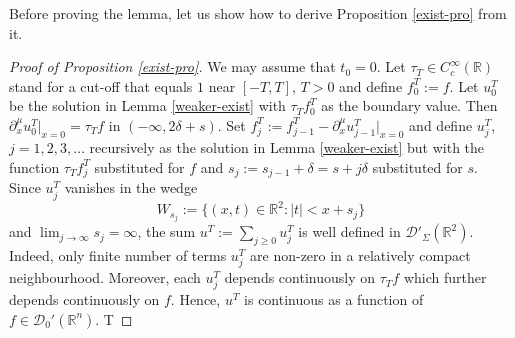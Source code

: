 \documentclass[10pt,a4paper]{article}
\theoremstyle{plain}
\theoremstyle{definition}
\theoremstyle{remark}
\numberwithin{equation}{section}
\newcommand{\R}{\mathbb{R}}
\begin{document}
Before proving the lemma, let us show how to derive Proposition \ref{exist-pro} from it. 

\begin{proof}[Proof of Proposition \ref{exist-pro}]
We may assume that $t_0 = 0$. 
Let { $\tau_T \in C_c^\infty(\R)$ stand for a cut-off that equals $1$ near $[-T, T]$, $T>0$ and define $f_0^T := f$. Let $ u_{0}^T$ be the solution in Lemma \ref{weaker-exist} with $\tau_T f_0^T$ as  the boundary value. }
Then $\partial_x^\mu u_0^{{T}} |_{x = 0} =   {\tau_T} f $ in $ (-\infty, 2\delta + s) $. 
%
Set $
f_j^T :=    f_{j-1}^T- \partial_x^\mu u_{j-1}^T |_{x=0} 
$ and define $u_{j}^{{T}}$, $j=1,2,3,\dots$ recursively as the solution in Lemma \ref{weaker-exist} but with the function ${\tau_T} f_j^T$  substituted for $f$  
and $s_j := s_{j-1} + \delta =  s + j \delta$ substituted for $s$.
Since $u_j^{{T}}$ vanishes in the wedge
\[
W_{s_j} := \{ (x,t) \in \R^2 : |t| <x +s_j\} 
 \]
 and $\lim_{j \to \infty} s_j = \infty$, 
the sum $u^{{T}} :=  \sum_{j \geq 0} u_j^{{T}}$ is well defined in $\mathcal{D}'_\Sigma(\R^2)$. Indeed, only finite number of terms $u_j^{{T}}$ are non-zero in a relatively compact neighbourhood. Moreover, each $u_j^{{T}}$ depends  continuously on $\tau_T f$ {which further depends continuously on $f$. }
Hence, $u^{T}$ is continuous as a function of $f \in {\mathcal{D}}_{0}'(\R^n)$.  
T



\end{proof}
\end{document}
